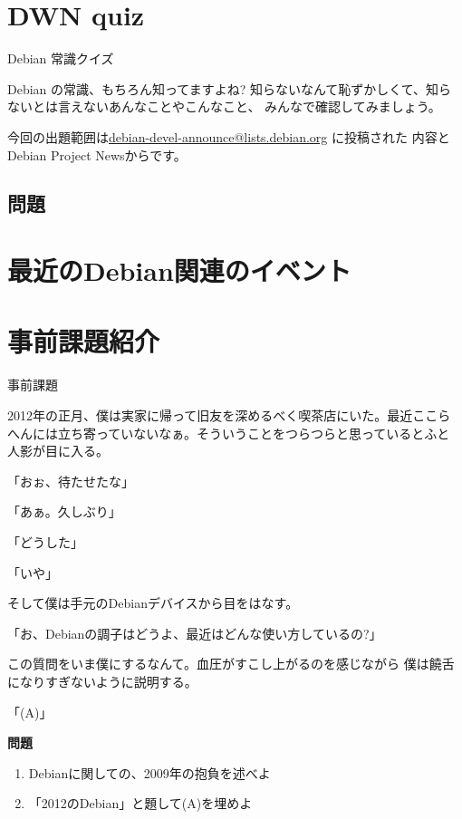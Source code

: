\section{DWN quiz}
\begin{frame}{Debian 常識クイズ}

Debian の常識、もちろん知ってますよね?
知らないなんて恥ずかしくて、知らないとは言えないあんなことやこんなこと、
みんなで確認してみましょう。

今回の出題範囲は\url{debian-devel-announce@lists.debian.org} に投稿された
内容とDebian Project Newsからです。

\end{frame}

\subsection{問題}


\section{最近のDebian関連のイベント}


\section{事前課題紹介}

\begin{frame}{事前課題}

2012年の正月、僕は実家に帰って旧友を深めるべく喫茶店にいた。最近ここら
へんには立ち寄っていないなぁ。そういうことをつらつらと思っているとふと
人影が目に入る。

「おぉ、待たせたな」

「あぁ。久しぶり」

「どうした」

「いや」

そして僕は手元のDebianデバイスから目をはなす。

「お、Debianの調子はどうよ、最近はどんな使い方しているの?」

この質問をいま僕にするなんて。血圧がすこし上がるのを感じながら
僕は饒舌になりすぎないように説明する。

「(A)」


{\bf 問題}

\begin{enumerate}
 \item Debianに関しての、2009年の抱負を述べよ
 \item 「2012のDebian」と題して(A)を埋めよ
\end{enumerate}

\end{frame}

